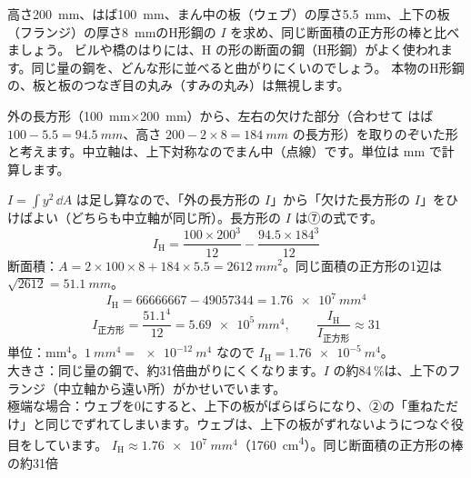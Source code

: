 \begin{phreidai}
\label{ph:力-10:ex8}高さ\qty{200}{mm}、はば\qty{100}{mm}、まん中の板（ウェブ）の厚さ\qty{5.5}{mm}、上下の板（フランジ）の厚さ\qty{8}{mm}のH形鋼の $I$ を求め、同じ断面積の正方形の棒と比べましょう。
\phbamen
ビルや橋のはりには、H の形の断面の鋼（H形鋼）がよく使われます。同じ量の鋼を、どんな形に並べると曲がりにくいのでしょう。
\phmushi
本物のH形鋼の、板と板のつなぎ目の丸み（すみの丸み）は無視します。
\phzu
\par\vspace{3pt}\noindent\begin{minipage}[c]{0.36\linewidth}
\centering
{}
\end{minipage}\hfill
\begin{minipage}[c]{0.60\linewidth}
外の長方形（\qty{100}{mm}×\qty{200}{mm}）から、左右の欠けた部分（合わせて はば $100-5.5=\qty{94.5}{mm}$、高さ $200-2\times8=\qty{184}{mm}$ の長方形）を取りのぞいた形と考えます。中立軸は、上下対称なのでまん中（点線）です。単位は mm で計算します。
\end{minipage}
\phriyu
$I=\displaystyle\int y^2\,\dd A$ は足し算なので、「外の長方形の $I$」から「欠けた長方形の $I$」をひけばよい（どちらも中立軸が同じ所）。長方形の $I$ は⑦の式です。
\phtateru
\[ I_{\mathrm H}=\frac{100\times200^3}{12}-\frac{94.5\times184^3}{12} \]
断面積：$A=2\times100\times8+184\times5.5=\qty{2612}{mm^2}$。同じ面積の正方形の1辺は $\sqrt{2612}=\qty{51.1}{mm}$。
\phtoku
\[ I_{\mathrm H}=\num{66666667}-\num{49057344}=\qty{1.76e7}{mm^4} \]
\[ I_{\text{正方形}}=\frac{51.1^4}{12}=\qty{5.69e5}{mm^4},\qquad \frac{I_{\mathrm H}}{I_{\text{正方形}}}\approx31 \]
\phtashikame
単位：mm$^4$。$\qty{1}{mm^4}=\qty{e-12}{m^4}$ なので $I_{\mathrm H}=\qty{1.76e-5}{m^4}$。\\
大きさ：同じ量の鋼で、約31倍曲がりにくくなります。$I$ の約84\,\%は、上下のフランジ（中立軸から遠い所）がかせいでいます。\\
極端な場合：ウェブを0にすると、上下の板がばらばらになり、②の「重ねただけ」と同じでずれてしまいます。ウェブは、上下の板がずれないようにつなぐ役目をしています。
\kotae $I_{\mathrm H}\approx\qty{1.76e7}{mm^4}$（\qty{1760}{cm^4}）。同じ断面積の正方形の棒の約31倍
\end{phreidai}
